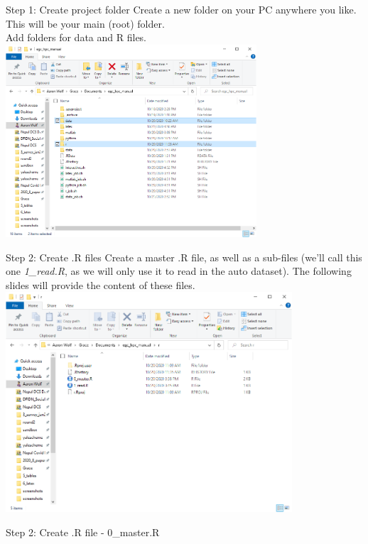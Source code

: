 \documentclass[10pt,xcolor={svgnames}]{beamer}
\begin{document}
\begin{frame}{Step 1: Create project folder}
\center
Create a new folder on your PC anywhere you like. This will be your main (root) folder. \\ Add folders for data and R files.
\includegraphics[width=0.7\textwidth]{screenshots/fig14a.PNG} 
\end{frame}

\begin{frame}{Step 2: Create .R files}
\center
Create a master .R file, as well as a sub-files (we'll call this one \textit{1\_read.R}, as we will only use it to read in the auto dataset). The following slides will provide the content of these files.
\includegraphics[width=0.8\textwidth]{screenshots/fig14b.PNG} 
\end{frame}


\begin{frame}[fragile]{Step 2: Create .R file - 0\_master.R}
\center
{}
\end{frame}
\end{document}
